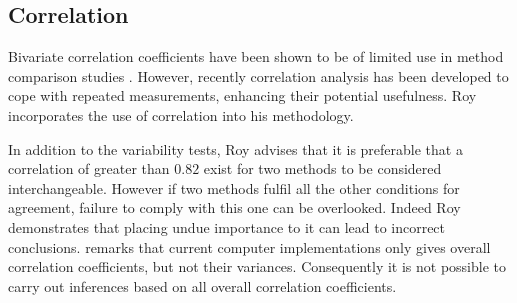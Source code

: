 \documentclass[12pt, a4paper]{report}
\theoremstyle{plain}
\theoremstyle{definition}
\theoremstyle{remark}
\begin{document}
%





























\subsection{Correlation}


Bivariate correlation coefficients have been shown to be of
limited use in method comparison studies \citep{BA86}. However,
recently correlation analysis has been developed to cope with
repeated measurements, enhancing their potential usefulness. Roy
incorporates the use of correlation into his methodology.

In addition to the variability tests, Roy advises that it is preferable that a correlation of greater than $0.82$ exist for two methods to be considered interchangeable. However if two methods fulfil all the other conditions for agreement, failure to comply with this one can be overlooked. Indeed Roy demonstrates that placing undue importance to it can lead to incorrect conclusions. \citet{ARoy2009} remarks that current computer implementations only gives overall correlation coefficients, but not their variances. Consequently it is not possible to carry out inferences based on all overall correlation coefficients.
\end{document}
